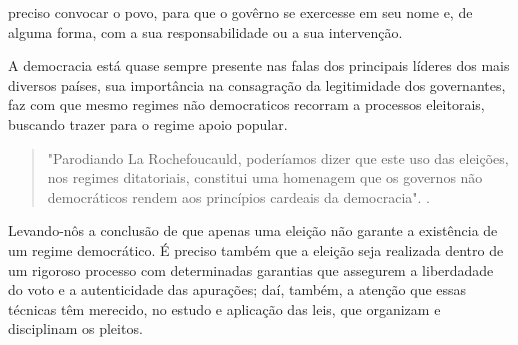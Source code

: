 preciso convocar o povo, para que o govêrno se exercesse em seu nome e, 
de alguma forma, com a sua responsabilidade ou a sua intervenção.
\cite[Eleição e Sistemas Eleitorais]{sobrinho1958eleiccao} \par
A democracia está quase sempre presente nas falas dos principais
líderes dos mais diversos países, sua importância na consagração da legitimidade
dos governantes, faz com que mesmo regimes não democraticos recorram a processos
eleitorais, buscando trazer para o regime apoio popular.\par
\begin{quote}
"Parodiando La Rochefoucauld, poderíamos dizer que este uso das eleições, nos 
regimes ditatoriais, constitui uma homenagem que os governos não democráticos
rendem aos princípios cardeais da democracia". \cite[Eleição e Sistemas Eleitorais]{sobrinho1958eleiccao}.
\end{quote} \par
Levando-nôs a conclusão de que apenas uma eleição não garante a existência de um
regime democrático. É preciso também que a eleição seja realizada dentro de um 
rigoroso processo com determinadas garantias que assegurem a liberdadade do voto
e a autenticidade das apurações; daí, também, a atenção que essas técnicas têm
merecido, no estudo e aplicação das leis, que organizam e disciplinam os pleitos. \par

\clearpage